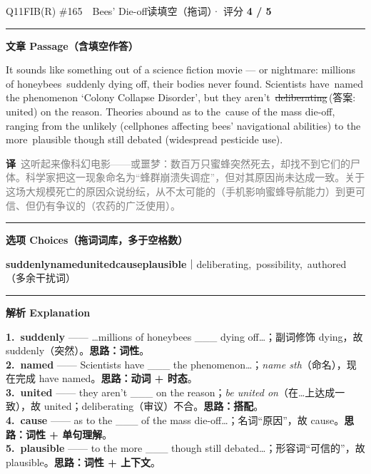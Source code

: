 \documentclass[11pt]{article}
\newcommand{\ptesub}[1]{%
  \par\needspace{2\baselineskip}\smallskip
  {\color{cAccent}\rule[-0.2ex]{3pt}{1.05em}}\hspace{6pt}%
  {\bfseries\color{cHead}#1}\par\nopagebreak\smallskip}
\newcommand{\zh}[1]{{\footnotesize\textcolor{cNote}{\textbf{译}}\ \textcolor{gray}{#1}}}
\newcommand{\rok}[1]{{\color{cFix}\ding{51}\,#1}}                 %
\newcommand{\rno}[2]{{\color{cWrong}\ding{55}\,\sout{#1}}\,{\footnotesize\color{cFix}(答案:\,#2)}}  %
\begin{document}
\begin{qblock}{Q11\quad FIB(R) \#165\ \ Bees' Die-off}{读填空（拖词）· 评分 \textcolor{cAccent}{\bfseries 4 / 5}}
\ptesub{文章 Passage（含填空作答）}
\begin{promptbox}
It sounds like something out of a science fiction movie --- or nightmare: millions of honeybees \rok{suddenly} dying off, their bodies never found. Scientists have \rok{named} the phenomenon `Colony Collapse Disorder', but they aren't \rno{deliberating}{united} on the reason. Theories abound as to the \rok{cause} of the mass die-off, ranging from the unlikely (cellphones affecting bees' navigational abilities) to the more \rok{plausible} though still debated (widespread pesticide use).
\end{promptbox}
\zh{这听起来像科幻电影——或噩梦：数百万只蜜蜂突然死去，却找不到它们的尸体。科学家把这一现象命名为“蜂群崩溃失调症”，但对其原因尚未达成一致。关于这场大规模死亡的原因众说纷纭，从不太可能的（手机影响蜜蜂导航能力）到更可信、但仍有争议的（农药的广泛使用）。}
\ptesub{选项 Choices（拖词词库，多于空格数）}
{\small \textbf{suddenly}\quad \textbf{named}\quad \textbf{united}\quad \textbf{cause}\quad \textbf{plausible}\quad ｜\quad deliberating,\ possibility,\ authored（多余干扰词）}
\ptesub{解析 Explanation}
\begin{notebox}\footnotesize
\textbf{1.\ suddenly} —— …millions of honeybees \_\_\_ dying off…；副词修饰 dying，故 suddenly（突然）。\textbf{思路：词性}。\\[2pt]
\textbf{2.\ named} —— Scientists have \_\_\_ the phenomenon…；\emph{name sth}（命名），现在完成 have named。\textbf{思路：动词 + 时态}。\\[2pt]
\textbf{3.\ united} —— they aren't \_\_\_ on the reason；\emph{be united on}（在…上达成一致），故 united；deliberating（审议）不合。\textbf{思路：搭配}。\\[2pt]
\textbf{4.\ cause} —— as to the \_\_\_ of the mass die-off…；名词“原因”，故 cause。\textbf{思路：词性 + 单句理解}。\\[2pt]
\textbf{5.\ plausible} —— to the more \_\_\_ though still debated…；形容词“可信的”，故 plausible。\textbf{思路：词性 + 上下文}。
\end{notebox}
\end{qblock}
\end{document}
